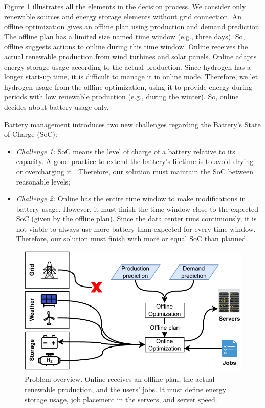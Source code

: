 Figure \ref{fig:introduction_problem} illustrates all the elements in the decision process. We consider only renewable sources and energy storage elements without grid connection. An offline optimization gives an offline plan using production and demand prediction. The offline plan has a limited size named time window (e.g., three days). So, offline suggests actions to online during this time window. Online receives the actual renewable production from wind turbines and solar panels. Online adapts energy storage usage according to the actual production. Since hydrogen has a longer start-up time, it is difficult to manage it in online mode. Therefore, we let hydrogen usage from the offline optimization, using it to provide energy during periods with low renewable production (e.g., during the winter). So, online decides about battery usage only. 

Battery management introduces two new challenges regarding the Battery's State of Charge (SoC):

\begin{itemize}
    \item \textit{Challenge 1:} SoC means the level of charge of a battery relative to its capacity. A good practice to extend the battery's lifetime is to avoid drying or overcharging it \cite{xu2016modeling}. Therefore, our solution must maintain the SoC between reasonable levels;
    \item \textit{Challenge 2:} Online has the entire time window to make modifications in battery usage. However, it must finish the time window close to the expected SoC (given by the offline plan). Since the data center runs continuously, it is not viable to always use more battery than expected for every time window. Therefore, our solution must finish with more or equal SoC than planned.
\end{itemize}

\begin{figure}[!htb]
    \centering
    \includegraphics[scale=1]{Images/Introduction/Problem_overview_thesis.pdf}
    \caption{Problem overview. Online receives an offline plan, the actual renewable production, and the users' jobs. It must define energy storage usage, job placement in the servers, and server speed.}
    \label{fig:introduction_problem}
\end{figure}

